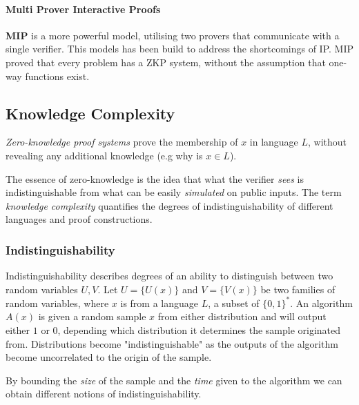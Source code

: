 \paragraph{Multi Prover Interactive Proofs}
\textbf{MIP} \cite{ben2019multi} is a more powerful model, utilising two provers that communicate with a single verifier.
This models has been build to address the shortcomings of IP.
MIP proved that every problem has a ZKP system, without the assumption that one-way functions exist.

\subsection{Knowledge Complexity}

\textit{Zero-knowledge proof systems} prove the  membership of $x$ in language $L$, without revealing any additional knowledge (e.g why is $x \in L$).

The essence of zero-knowledge is the idea that what the verifier \textit{sees} is indistinguishable from what can be easily \textit{simulated} on public inputs.
The term \textit{knowledge complexity} quantifies the degrees of indistinguishability of different languages and proof constructions. 

\subsubsection{Indistinguishability}
Indistinguishability describes degrees of an ability to distinguish between two random variables $U, V$.
\bigskip
\newline
Let $U = \{U(x)\}$ and $V = \{V(x)\}$ be two families of random variables, where $x$ is from a language $L$, a subset of $\{0, 1\}^*$.
\newline
An algorithm $A(x)$ is given a random sample $x$ from either distribution and will output either $1$ or $0$, depending which distribution it determines the sample originated from.
Distributions become "indistinguishable" as the outputs of the algorithm become uncorrelated to the origin of the sample.

By bounding the \textit{size} of the sample and the \textit{time} given to the algorithm we can obtain different notions of indistinguishability.

%
%
%



